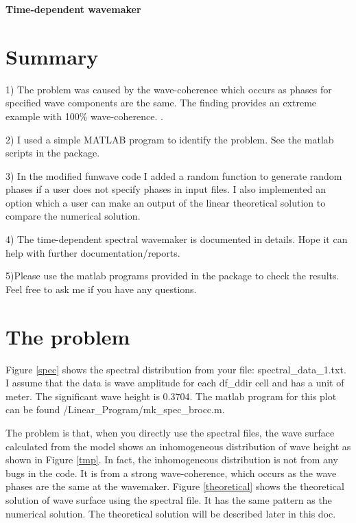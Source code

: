 \documentclass[preprint,10pt]{elsarticle}
\begin{document}

\begin{center}
{\bf \Huge Time-dependent wavemaker}
 \end{center}
 
 \section{Summary}
 
 1) The problem was caused by the wave-coherence which occurs as  phases for specified wave components are the same. The finding provides an extreme example with 100\% wave-coherence. . 
 
 2) I used a simple MATLAB program to identify the problem. See the matlab scripts in the package. 
 
 3) In the modified funwave code I added a random function to generate random phases if a user does not specify phases in input files. I also implemented an option which a user can make an output of the linear theoretical solution to compare  the numerical solution.  
 
 4) The time-dependent spectral wavemaker is documented in details. Hope it can help with further documentation/reports. 
 
 5)Please use the matlab programs provided in the package to check the results. Feel free to ask me if you have any questions. 
 
 
 \section{The problem  } 
  
  Figure \ref{spec} shows the spectral distribution from your file: spectral\_data\_1.txt. I assume that the data is wave amplitude for each df\_ddir cell and has a unit of meter. The significant wave height is 0.3704.  The matlab program for this plot can be found /Linear\_Program/mk\_spec\_brocc.m. 
  
The problem is that, when you directly use the spectral files, the wave surface calculated from the model shows an inhomogeneous distribution of wave height as shown in Figure \ref{tmp}. In fact, the inhomogeneous distribution is not from any bugs in the code. It is from a strong wave-coherence, which occurs as the wave phases are the same at the wavemaker. Figure \ref{theoretical} shows the theoretical solution of wave surface using the spectral file. It has the same pattern as the numerical solution. The theoretical solution will be described later in this doc. 
  
\end{document}
